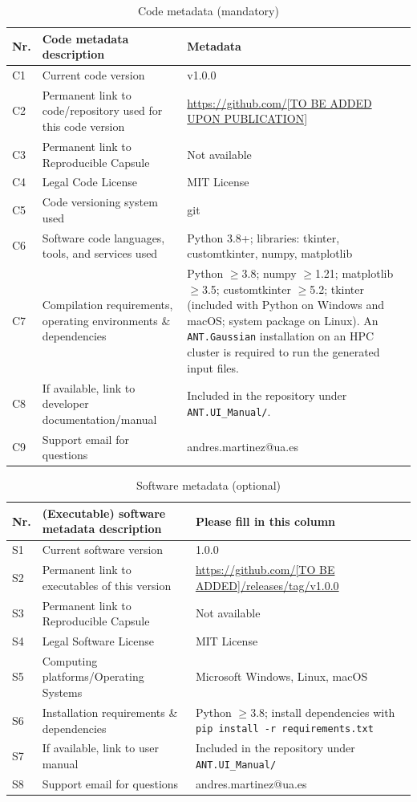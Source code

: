 \documentclass[preprint,12pt, a4paper]{elsarticle}
\begin{document}
\begin{table}[!h]
\begin{tabular}{|l|p{6.5cm}|p{6.5cm}|}
\hline
\textbf{Nr.} & \textbf{Code metadata description} & \textbf{Metadata} \\
\hline
C1 & Current code version & v1.0.0 \\
\hline
C2 & Permanent link to code/repository used for this code version & \url{https://github.com/[TO BE ADDED UPON PUBLICATION]} \\
\hline
C3  & Permanent link to Reproducible Capsule & Not available \\
\hline
C4 & Legal Code License   & MIT License \\
\hline
C5 & Code versioning system used & git \\
\hline
C6 & Software code languages, tools, and services used & Python 3.8+; libraries: tkinter, customtkinter, numpy, matplotlib \\
\hline
C7 & Compilation requirements, operating environments \& dependencies & Python $\geq$3.8; numpy $\geq$1.21; matplotlib $\geq$3.5; customtkinter $\geq$5.2; tkinter (included with Python on Windows and macOS; system package on Linux). An \texttt{ANT.Gaussian} installation on an HPC cluster is required to run the generated input files. \\
\hline
C8 & If available, link to developer documentation/manual & Included in the repository under \texttt{ANT.UI\_Manual/}. \\
\hline
C9 & Support email for questions & andres.martinez@ua.es \\
\hline
\end{tabular}
\caption{Code metadata (mandatory)}
\label{codeMetadata}
\end{table}

\begin{table}[!h]
\begin{tabular}{|l|p{6.5cm}|p{6.5cm}|}
\hline
\textbf{Nr.} & \textbf{(Executable) software metadata description} & \textbf{Please fill in this column} \\
\hline
S1 & Current software version & 1.0.0 \\
\hline
S2 & Permanent link to executables of this version  & \url{https://github.com/[TO BE ADDED]/releases/tag/v1.0.0} \\
\hline
S3  & Permanent link to Reproducible Capsule & Not available \\
\hline
S4 & Legal Software License & MIT License \\
\hline
S5 & Computing platforms/Operating Systems & Microsoft Windows, Linux, macOS \\
\hline
S6 & Installation requirements \& dependencies & Python $\geq$3.8; install dependencies with \texttt{pip install -r requirements.txt} \\
\hline
S7 & If available, link to user manual & Included in the repository under \texttt{ANT.UI\_Manual/} \\
\hline
S8 & Support email for questions & andres.martinez@ua.es \\
\hline
\end{tabular}
\caption{Software metadata (optional)}
\label{executabelMetadata}
\end{table}
\end{document}
